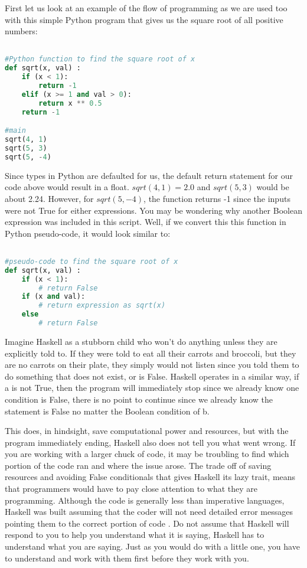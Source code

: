 \documentclass{article}
\begin{document}
\medskip\noindent
First let us look at an example of the flow of programming as we are used too with this simple Python program that gives us the square root of all positive numbers:

\begin{lstlisting}[language=Python]

#Python function to find the square root of x
def sqrt(x, val) :
    if (x < 1):
        return -1
    elif (x >= 1 and val > 0):
        return x ** 0.5
    return -1

#main
sqrt(4, 1)
sqrt(5, 3)
sqrt(5, -4)
\end{lstlisting}
\noindent
Since types in Python are defaulted for us, the default return statement for our code above would result in a float. $sqrt(4, 1) = 2.0$ and $sqrt(5, 3)$ would be about 2.24. However, for $sqrt(5, -4)$, the function returns -1 since the inputs were not True for either expressions. You may be wondering why another Boolean expression was included in this script. Well, if we convert this this function in Python pseudo-code, it would look similar to:

\begin{lstlisting}[language=Python]

#pseudo-code to find the square root of x
def sqrt(x, val) :
    if (x < 1):
        # return False
    if (x and val):
        # return expression as sqrt(x)
    else
        # return False
\end{lstlisting}
\noindent
Imagine Haskell as a stubborn child who won't do anything unless they are explicitly told to. If they were told to eat all their carrots and broccoli, but they are no carrots on their plate, they simply would not listen since you told them to do something that does not exist, or is False. Haskell operates in a similar way, if a is not True, then the program will immediately stop since we already know one condition is False, there is no point to continue since we already know the statement is False no matter the Boolean condition of b. 

\medskip\noindent
This does, in hindsight, save computational power and resources, but with the program immediately ending, Haskell also does not tell you what went wrong. If you are working with a larger chuck of code, it may be troubling to find which portion of the code ran and where the issue arose. The trade off of saving resources and avoiding False conditionals that gives Haskell its lazy trait, means that programmers would have to pay close attention to what they are programming. Although the code is generally less than imperative languages, Haskell was built assuming that the coder will not need detailed error messages pointing them to the correct portion of code \cite{LYH}. Do not assume that Haskell will respond to you to help you understand what it is saying, Haskell has to understand what you are saying. Just as you would do with a little one, you have to understand and work with them first before they work with you.
\end{document}
